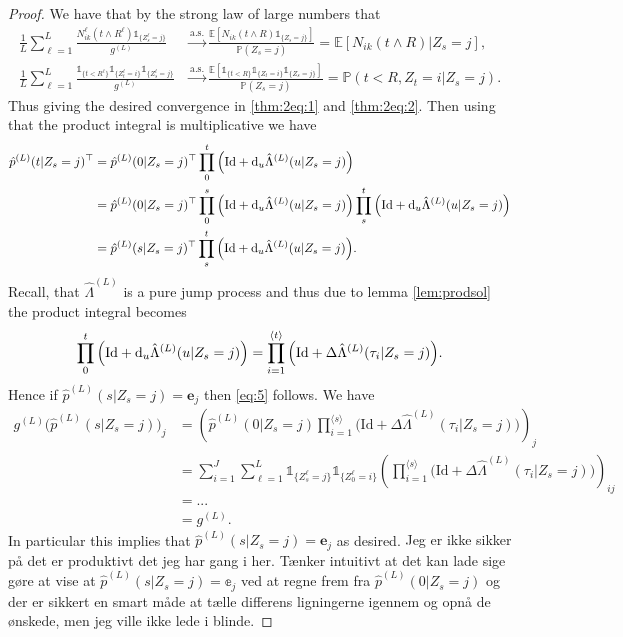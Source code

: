 \documentclass[12pt,letter,twoside]{article}
\theoremstyle{plain}
\theoremstyle{definition}
\theoremstyle{remark}
\begin{document}
\begin{proof}
We have that by the strong law of large numbers that
\begin{align}
    \frac{1}{L}\sum_{\ell = 1}^L\frac{ N^\ell_{ik}(t\wedge R^\ell)\mathds 1_{\{Z_s^\ell=j\}}}{g^{(L)}}&\stackrel{\text{a.s.}}{\to}\frac{\mathbb E\left[N_{ik}(t\wedge R)\mathds 1_{\{Z_s=j\}}\right]}{\mathbb P\left(Z_s=j\right)}=\mathbb E\left[N_{ik}(t\wedge R)\vert Z_s=j\right],\\
    \frac{1}{L}\sum_{\ell = 1}^L \frac{\mathds 1_{\{t<R^\ell\}}\mathds 1_{\{Z_t^\ell = i\}}\mathds 1_{\{Z_s^\ell=j\}}}{g^{(L)}}&\stackrel{\text{a.s.}}{\to}\frac{\mathbb E\left[\mathds 1_{\{t<R\}}\mathds 1_{\{Z_t = i\}}\mathds 1_{\{Z_s=j\}}\right]}{\mathbb P\left(Z_s=j\right)}=\mathbb P\left(t<R,Z_t=i\vert Z_s=j\right).
\end{align}
Thus giving the desired convergence in \ref{thm:2eq:1} and \ref{thm:2eq:2}. Then using that the product integral is multiplicative we have
\begin{align}
\hat p^{(L)}(t\vert Z_s=j)^\top&=\hat p^{(L)}(0\vert Z_s=j)^\top\prod_{0}^t\Big(\text{Id}+ \text d_u\hat \Lambda^{(L)}(u\vert Z_s=j)\Big)\\
&=\hat p^{(L)}(0\vert Z_s=j)^\top\prod_{0}^s\Big(\text{Id}+ \text d_u\hat \Lambda^{(L)}(u\vert Z_s=j)\Big)\prod_{s}^t\Big(\text{Id}+ \text d_u\hat \Lambda^{(L)}(u\vert Z_s=j)\Big)\\
&=\hat p^{(L)}(s\vert Z_s=j)^\top\prod_{s}^t\Big(\text{Id}+ \text d_u\hat \Lambda^{(L)}(u\vert Z_s=j)\Big).
\end{align}
Recall, that $\hat \Lambda^{(L)}$ is a pure jump process and thus due to lemma \ref{lem:prodsol} the product integral becomes
\begin{align}
\prod_{0}^t\Big(\text{Id}+ \text d_u\hat \Lambda^{(L)}(u\vert Z_s=j)\Big)=\prod_{i=1}^{\langle t\rangle }\Big(\text{Id}+ \Delta\hat \Lambda^{(L)}(\tau_i\vert Z_s=j)\Big).
\end{align}
Hence if $\hat p^{(L)}(s\vert Z_s=j)=\mathbf e_j$ then \ref{eq:5} follows. We have
\begin{align}
g^{(L)}\Big(\hat p^{(L)}(s\vert Z_s=j)\Big)_j&=\left(\hat p^{(L)}(0\vert Z_s=j)\prod_{i=1}^{\langle s\rangle }\Big(\text{Id}+ \Delta\hat \Lambda^{(L)}(\tau_i\vert Z_s=j)\Big)\right)_j\\
&=\sum_{i=1}^J\sum_{\ell = 1}^L \mathds 1_{\{Z_s^\ell=j\}}\mathds 1_{\{Z_0^\ell=i\}}\left(\prod_{i=1}^{\langle s\rangle }\Big(\text{Id}+ \Delta\hat \Lambda^{(L)}(\tau_i\vert Z_s=j)\Big)\right)_{ij}\\
&=...\\
&=g^{(L)}.
\end{align}
In particular this implies that $\hat p^{(L)}(s\vert Z_s=j)=\mathbf e_j$ as desired. {\color{red} Jeg er ikke sikker på det er produktivt det jeg har gang i her. Tænker intuitivt at det kan lade sige gøre at vise at $\hat p^{(L)}(s\vert Z_s=j)=\mathbb e_j$ ved at regne frem fra $\hat p^{(L)}(0\vert Z_s=j)$ og der er sikkert en smart måde at tælle differens ligningerne igennem og opnå de ønskede, men jeg ville ikke lede i blinde.}
\end{proof}
\end{document}
